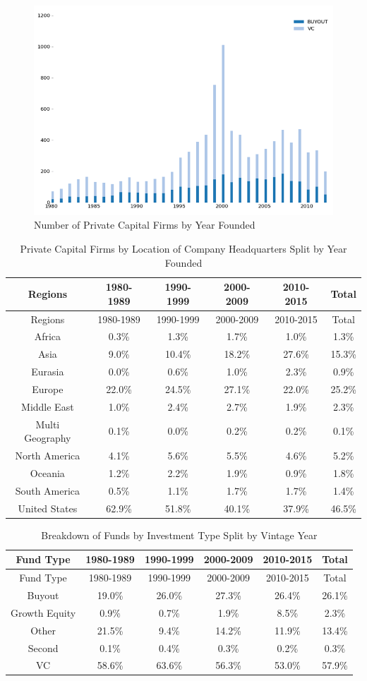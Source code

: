 \documentclass[
]{book}
\begin{document}
\begin{figure}
\includegraphics[width=1\linewidth]{./assets/pcri/pcrifigurea1web} \caption{Number of Private Capital Firms by Year Founded}\label{fig:pcrifigurea1}
\end{figure}

\begin{longtable}[]{@{}cccccc@{}}
\caption{\label{tab:pcritablea1} Private Capital Firms by Location of Company Headquarters Split by Year Founded}\tabularnewline
\toprule
Regions & 1980-1989 & 1990-1999 & 2000-2009 & 2010-2015 & Total\tabularnewline
\midrule
\endfirsthead
\toprule
Regions & 1980-1989 & 1990-1999 & 2000-2009 & 2010-2015 & Total\tabularnewline
\midrule
\endhead
Africa & 0.3\% & 1.3\% & 1.7\% & 1.0\% & 1.3\%\tabularnewline
Asia & 9.0\% & 10.4\% & 18.2\% & 27.6\% & 15.3\%\tabularnewline
Eurasia & 0.0\% & 0.6\% & 1.0\% & 2.3\% & 0.9\%\tabularnewline
Europe & 22.0\% & 24.5\% & 27.1\% & 22.0\% & 25.2\%\tabularnewline
Middle East & 1.0\% & 2.4\% & 2.7\% & 1.9\% & 2.3\%\tabularnewline
Multi Geography & 0.1\% & 0.0\% & 0.2\% & 0.2\% & 0.1\%\tabularnewline
North America & 4.1\% & 5.6\% & 5.5\% & 4.6\% & 5.2\%\tabularnewline
Oceania & 1.2\% & 2.2\% & 1.9\% & 0.9\% & 1.8\%\tabularnewline
South America & 0.5\% & 1.1\% & 1.7\% & 1.7\% & 1.4\%\tabularnewline
United States & 62.9\% & 51.8\% & 40.1\% & 37.9\% & 46.5\%\tabularnewline
\bottomrule
\end{longtable}

\begin{longtable}[]{@{}cccccc@{}}
\caption{\label{tab:pcritablea2} Breakdown of Funds by Investment Type Split by Vintage Year}\tabularnewline
\toprule
Fund Type & 1980-1989 & 1990-1999 & 2000-2009 & 2010-2015 & Total\tabularnewline
\midrule
\endfirsthead
\toprule
Fund Type & 1980-1989 & 1990-1999 & 2000-2009 & 2010-2015 & Total\tabularnewline
\midrule
\endhead
Buyout & 19.0\% & 26.0\% & 27.3\% & 26.4\% & 26.1\%\tabularnewline
Growth Equity & 0.9\% & 0.7\% & 1.9\% & 8.5\% & 2.3\%\tabularnewline
Other & 21.5\% & 9.4\% & 14.2\% & 11.9\% & 13.4\%\tabularnewline
Second & 0.1\% & 0.4\% & 0.3\% & 0.2\% & 0.3\%\tabularnewline
VC & 58.6\% & 63.6\% & 56.3\% & 53.0\% & 57.9\%\tabularnewline
\bottomrule
\end{longtable}
\end{document}
